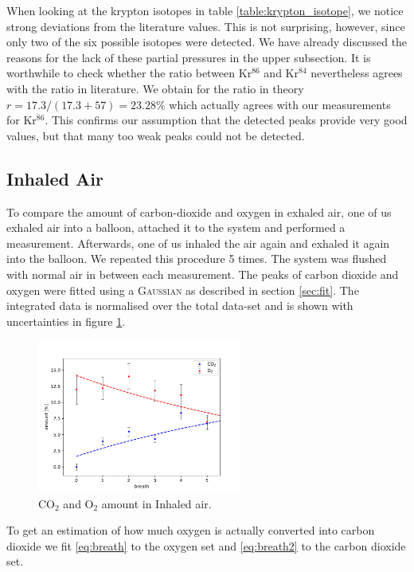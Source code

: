     When looking at the krypton isotopes in table \ref{table:krypton_isotope}, we notice strong deviations from the literature values. This is not surprising, however, since only two of the six possible isotopes were detected. We have already discussed the reasons for the lack of these partial pressures in the upper subsection.  It is worthwhile to check whether the ratio between Kr$^{86}$ and Kr$^{84}$ nevertheless agrees with the ratio in literature. We obtain for the ratio in theory $r = 17.3/(17.3+57) = 23.28 \%$ which actually agrees with our measurements for Kr$^{86}$. This confirms our assumption that the detected peaks provide very good values, but that many too weak peaks could not be detected.
 


    \newpage

    \subsection{Inhaled Air}
    To compare the amount of carbon-dioxide and oxygen in exhaled air, one of us exhaled air into a balloon, attached it to the system and performed a measurement. Afterwards, one of us inhaled the air again and exhaled it again into the balloon. We repeated this procedure 5 times. The system was flushed with normal air in between each measurement. The peaks of carbon dioxide and oxygen were fitted using a {\scshape Gaussian} as described in section \ref{sec:fit}. The integrated data is normalised over the total data-set and is shown with uncertainties in figure \ref{fig:air}. 
    \begin{figure}[h!]
        \centering
        \includegraphics[width=0.6\textwidth]{Report/DataResultsPlots/air.pdf}
        \caption{CO$_2$ and O$_2$ amount in Inhaled air.}
        \label{fig:air}
    \end{figure}
    To get an estimation of how much oxygen is actually converted into carbon dioxide we fit \eqref{eq:breath} to the oxygen set and \eqref{eq:breath2} to the carbon dioxide set.
